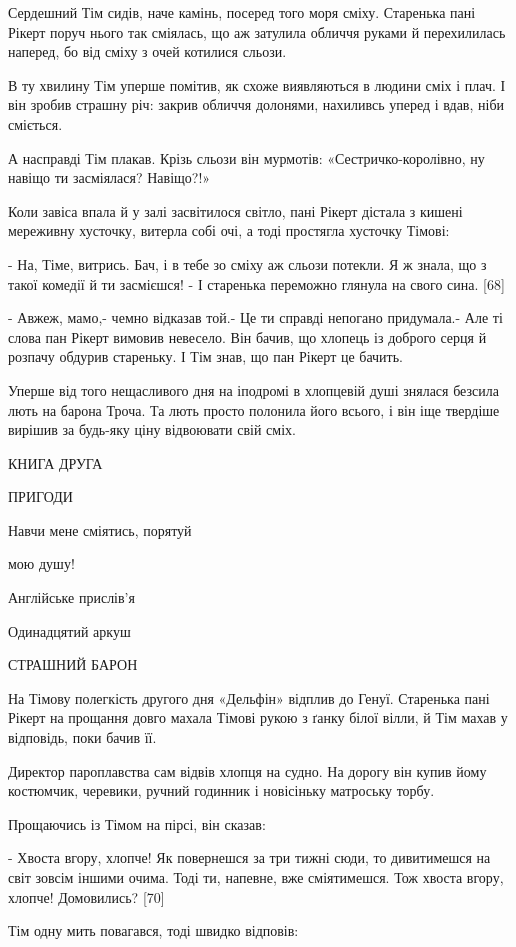 Сердешний Тім сидів, наче камінь, посеред того моря сміху. Старенька пані Рікерт поруч нього так сміялась, що аж затулила обличчя руками й перехилилась наперед, бо від сміху з очей котилися сльози.

В ту хвилину Тім уперше помітив, як схоже виявляються в людини сміх і плач. І він зробив страшну річ: закрив обличчя долонями, нахиливсь уперед і вдав, ніби сміється.

А насправді Тім плакав. Крізь сльози він мурмотів: «Сестричко-королівно, ну навіщо ти засміялася? Навіщо?!»

Коли завіса впала й у залі засвітилося світло, пані Рікерт дістала з кишені мереживну хусточку, витерла собі очі, а тоді простягла хусточку Тімові:

- На, Тіме, витрись. Бач, і в тебе зо сміху аж сльози потекли. Я ж знала, що з такої комедії й ти засмієшся! - І старенька переможно глянула на свого сина. [68]

- Авжеж, мамо,- чемно відказав той.- Це ти справді непогано придумала.- Але ті слова пан Рікерт вимовив невесело. Він бачив, що хлопець із доброго серця й розпачу обдурив стареньку. І Тім знав, що пан Рікерт це бачить.

Уперше від того нещасливого дня на іподромі в хлопцевій душі знялася безсила лють на барона Троча. Та лють просто полонила його всього, і він іще твердіше вирішив за будь-яку ціну відвоювати свій сміх.

КНИГА ДРУГА

ПРИГОДИ

Навчи мене сміятись, порятуй

мою душу!

Англійське прислів'я

Одинадцятий аркуш

СТРАШНИЙ БАРОН

На Тімову полегкість другого дня «Дельфін» відплив до Генуї. Старенька пані Рікерт на прощання довго махала Тімові рукою з ґанку білої вілли, й Тім махав у відповідь, поки бачив її.

Директор пароплавства сам відвів хлопця на судно. На дорогу він купив йому костюмчик, черевики, ручний годинник і новісіньку матроську торбу.

Прощаючись із Тімом на пірсі, він сказав:

- Хвоста вгору, хлопче! Як повернешся за три тижні сюди, то дивитимешся на світ зовсім іншими очима. Тоді ти, напевне, вже сміятимешся. Тож хвоста вгору, хлопче! Домовились? [70]

Тім одну мить повагався, тоді швидко відповів:

